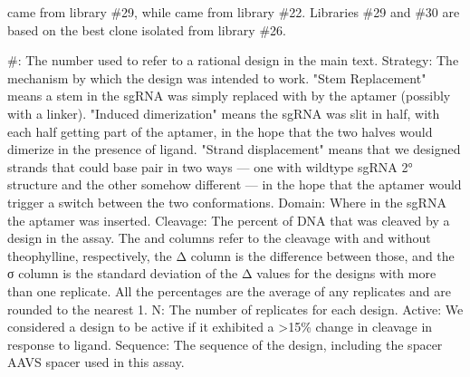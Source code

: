 \documentclass[10pt,oneside]{article}
\begin{document}
      \ligrnaF{} came from library \#29, while \ligrnaB{} came from library \#22.  Libraries \#29 and \#30 are based on the best clone isolated from library \#26.



    \#: The number used to refer to a rational design in the main text.
    Strategy: The mechanism by which the design was intended to work.  "Stem Replacement" means a stem in the sgRNA was simply replaced with by the aptamer (possibly with a linker).  "Induced dimerization" means the sgRNA was slit in half, with each half getting part of the aptamer, in the hope that the two halves would dimerize in the presence of ligand.  "Strand displacement" means that we designed strands that could base pair in two ways --- one with wildtype sgRNA 2° structure and the other somehow different --- in the hope that the aptamer would trigger a switch between the two conformations.
    Domain: Where in the sgRNA the aptamer was inserted.
    Cleavage: The percent of DNA that was cleaved by a design in the \invitro{} assay.  The \apo{} and \holo{} columns refer to the cleavage with and without theophylline, respectively, the Δ column is the difference between those, and the σ column is the standard deviation of the Δ values for the designs with more than one replicate.  All the percentages are the average of any replicates and are rounded to the nearest 1.
    N: The number of replicates for each design.
    Active: We considered a design to be active if it exhibited a >15\% change in cleavage in response to ligand.  
% 
% 
% 
%
    Sequence: The sequence of the design, including the spacer AAVS spacer used in this assay.


\end{document}
